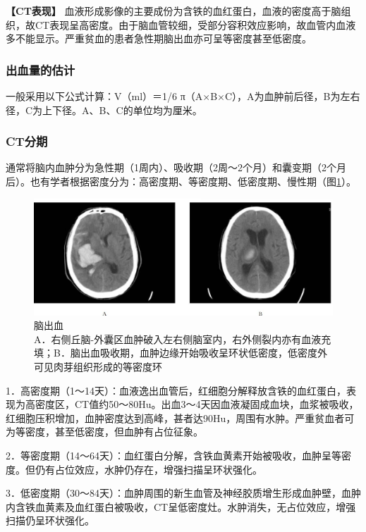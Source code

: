 \textbf{【CT表现】}
血液形成影像的主要成份为含铁的血红蛋白，血液的密度高于脑组织，故CT表现呈高密度。由于脑血管较细，受部分容积效应影响，故血管内血液多不能显示。严重贫血的患者急性期脑出血亦可呈等密度甚至低密度。

\subsubsection{出血量的估计}

一般采用以下公式计算：V（ml）＝1/6
π（A×B×C），A为血肿前后径，B为左右径，C为上下径。A、B、C的单位均为厘米。

\subsubsection{CT分期}

通常将脑内血肿分为急性期（1周内）、吸收期（2周～2个月）和囊变期（2个月后）。也有学者根据密度分为：高密度期、等密度期、低密度期、慢性期（图\ref{fig2-24}）。

\begin{figure}[!htbp]
 \centering
 \includegraphics[width=.7\textwidth,height=\textheight,keepaspectratio]{./images/Image00042.jpg}
 \captionsetup{justification=centering}
 \caption{脑出血\\{\small A．右侧丘脑-外囊区血肿破入左右侧脑室内，右外侧裂内亦有血液充填；B．脑出血吸收期，血肿边缘开始吸收呈环状低密度，低密度外可见肉芽组织形成的等密度环}}
 \label{fig2-24}
  \end{figure} 

1．高密度期（1～14天）：血液逸出血管后，红细胞分解释放含铁的血红蛋白，表现为高密度区，CT值约50～80Hu。出血3～4天因血液凝固成血块，血浆被吸收，红细胞压积增加，血肿密度达到高峰，甚者达90Hu，周围有水肿。严重贫血者可为等密度，甚至低密度，但血肿有占位征象。

2．等密度期（14～64天）：血红蛋白分解，含铁血黄素开始被吸收，血肿呈等密度。但仍有占位效应，水肿仍存在，增强扫描呈环状强化。

3．低密度期（30～84天）：血肿周围的新生血管及神经胶质增生形成血肿壁，血肿内含铁血黄素及血红蛋白被吸收，CT呈低密度灶。水肿消失，无占位效应，增强扫描仍呈环状强化。

